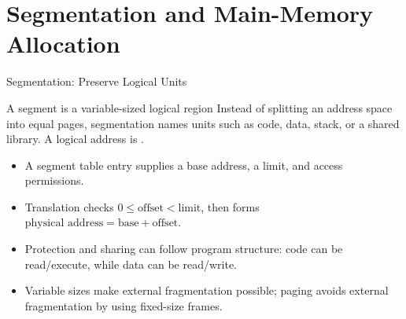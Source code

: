 \documentclass[aspectratio=169]{beamer}
\begin{document}

\section{Segmentation and Main-Memory Allocation}

\begin{frame}{Segmentation: Preserve Logical Units}
  \begin{block}{A segment is a variable-sized logical region}
    Instead of splitting an address space into equal pages, segmentation names
    units such as code, data, stack, or a shared library. A logical address is
    .
  \end{block}
  \begin{itemize}
    \item A segment table entry supplies a base address, a limit, and access
      permissions.
    \item Translation checks $0\leq\text{offset}<\text{limit}$, then forms
      $\text{physical address}=\text{base}+\text{offset}$.
    \item Protection and sharing can follow program structure: code can be
      read/execute, while data can be read/write.
    \item Variable sizes make external fragmentation possible; paging avoids
      external fragmentation by using fixed-size frames.
  \end{itemize}
\end{frame}
\end{document}
